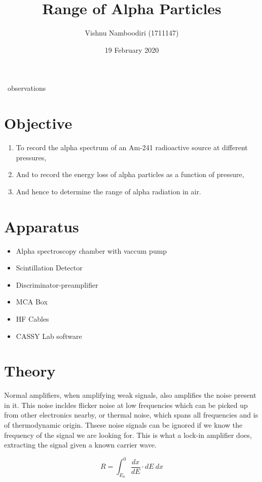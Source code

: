 \documentclass[a4paper]{article}
\title{\textbf{Range of Alpha Particles}}
\author{Vishnu Namboodiri (1711147)}
\date{19 February 2020}
\begin{document}
\maketitle

~observations~


\section*{Objective}

\begin{enumerate}
	\item To record the alpha spectrum of an Am-241 radioactive source at different pressures,
	\item And to record the energy loss of alpha particles as a function of pressure, 
	\item And hence to determine the range of alpha radiation in air.
\end{enumerate}



\section*{Apparatus}



\begin{itemize}
	\item Alpha spectroscopy chamber with vaccum pump
	\item Scintillation Detector
	\item Discriminator-preamplifier
	\item MCA Box
	\item HF Cables
	\item CASSY Lab software
\end{itemize}


\section*{Theory}


Normal amplifiers, when amplifying weak signals, also amplifies the noise present in it. This noise incldes flicker noise at low frequencies which can be picked up from other electronics nearby, or thermal noise, which spans all frequencies and is of thermodynamic origin. Thsese noise signals can be ignored if we know the frequency of the signal we are looking for. This is what a lock-in amplifier does, extracting the signal given a known carrier wave.


$$R=\int_{E_0}^{0} \frac{dx}{dE} \cdot dE \ dx$$
\end{document}
